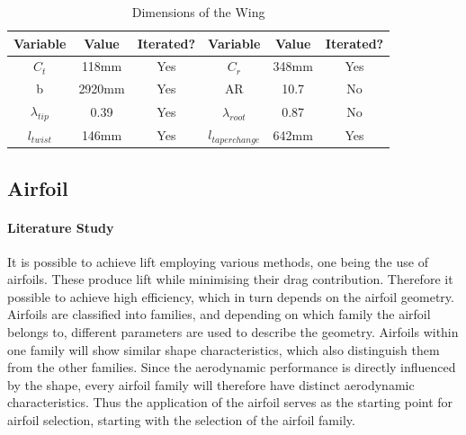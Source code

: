 \begin{table}[H]
    \centering
    \begin{tabular}{ccc|ccc}
    Variable     &  Value & Iterated? & Variable & Value & Iterated?\\ \toprule
    $C_t$     & 118mm & Yes & $C_r$ & 348mm & Yes\\
    b & 2920mm & Yes & AR & 10.7 & No \\
    $\lambda_{tip}$ & 0.39 & Yes & $\lambda_{root}$ & 0.87 & No \\
    $l_{twist}$ & 146mm & Yes & $l_{taperchange}$ & 642mm & Yes
    \end{tabular}
    \caption{Dimensions of the Wing}
    \label{tab:dimensionswing}
\end{table}


\subsection*{Airfoil}

\paragraph{Literature Study} It is possible to achieve lift employing various methods, one being the use of airfoils. These produce lift while minimising their drag contribution. Therefore it possible to achieve high efficiency, which in turn depends on the airfoil geometry. Airfoils are classified into families, and depending on which family the airfoil belongs to, different parameters are used to describe the geometry. Airfoils within one family will show similar shape characteristics, which also distinguish them from the other families. Since the aerodynamic performance is directly influenced by the shape, every airfoil family will therefore have distinct aerodynamic characteristics. Thus the application of the airfoil serves as the starting point for airfoil selection, starting with the selection of the airfoil family.


